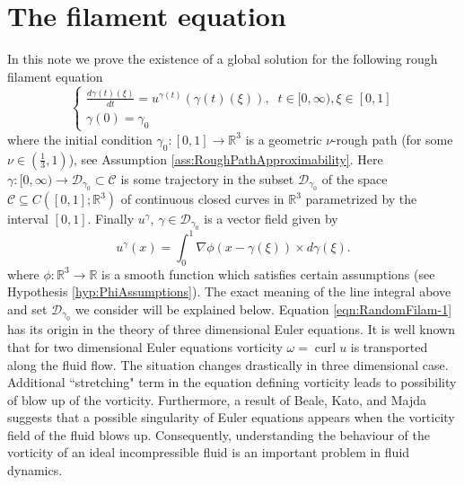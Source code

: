 \documentclass[11pt,a4paper,reqno]{amsart}%
\theoremstyle{plain}
\theoremstyle{remark}
\theoremstyle{plain}
\numberwithin{equation}{section}
\newcommand\curl{\operatorname{curl}}
\def\Rnu{{\mathbb R}}
\begin{document}
\section{The filament equation}
In this note we prove the existence of a global solution for the following rough
 filament equation
\begin{equation}\label{eqn:RandomFilam-1}
\begin{cases}
\frac{d\gamma(t)(\xi)}{dt} = u^{\gamma(t)}(\gamma(t)(\xi)), \;\; t\in [0,\infty),\xi\in[0,1] \\
\gamma(0) = \gamma_0
\end{cases}
\end{equation}
where the initial condition $\gamma_0:[0,1]\to\mathbb{R}^3$ is a  geometric $\nu$-rough path (for some  $\nu\in(\frac{1}{3},1)$),  see Assumption \ref{ass:RoughPathApproximability}. Here $\gamma:[0,\infty)\to \mathcal{D}_{\gamma_0}\subset \mathcal{C}$ is some trajectory in
the subset $\mathcal{D}_{\gamma_0}$ of the space $\mathcal{C}\subseteq C([0,1];\Rnu^3)$ of continuous closed curves in
$\Rnu^3$ parametrized by the interval $[0,1]$. Finally $u^\gamma$, $\gamma\in \mathcal{D}_{\gamma_0}$ is a vector field
given by
\begin{equation}
u^\gamma(x)=\int_0^1\nabla\phi(x-\gamma(\xi))\times d\gamma(\xi).\label{eqn:RandomFilam-3}
\end{equation}
where $\phi:\Rnu^3\to\Rnu$ is a smooth function which satisfies
certain assumptions (see Hypothesis \ref{hyp:PhiAssumptions}).
The exact meaning of the line integral above and set $\mathcal{D}_{\gamma_0}$ we consider
will be explained below. Equation \eqref{eqn:RandomFilam-1} has its origin in
the theory of three dimensional Euler equations.
It is well known that for two dimensional Euler equations vorticity ${\omega}=\curl {u}$ is transported along the fluid flow.
The situation changes drastically in three dimensional case. Additional ``stretching" term in the equation defining vorticity
leads to possibility of blow up of the vorticity.
Furthermore, a result of Beale,
Kato, and Majda \cite{[BKM-1984]} suggests that a possible
singularity of Euler equations appears when the vorticity field of the 
fluid blows up. Consequently, understanding the behaviour of the vorticity of an ideal incompressible fluid is an  important problem in fluid dynamics.
\end{document}
